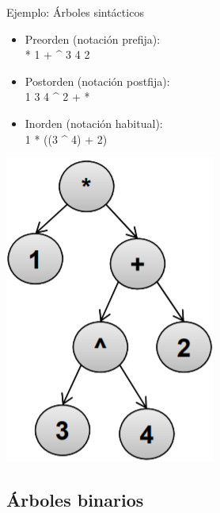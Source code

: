 \documentclass[handout]{beamer} %
\begin{document}
\begin{frame}{Ejemplo: Árboles sintácticos}
    \begin{minipage}{0.6\textwidth}
    \begin{itemize}
        \item Preorden (notación prefija):\\ * 1 + \^{} 3 4 2
        \item Postorden (notación postfija):\\
        1 3 4 \^{} 2 + *
        \item Inorden (notación habitual):\\
         1 * ((3 \^{} 4) + 2)
    \end{itemize}
    \end{minipage}
    \begin{minipage}{0.38\textwidth}
        \includegraphics[width=.7\textwidth]{./image/cap3/tree-operations}
    \end{minipage}
\end{frame}

\subsection{Árboles binarios}
\end{document}
